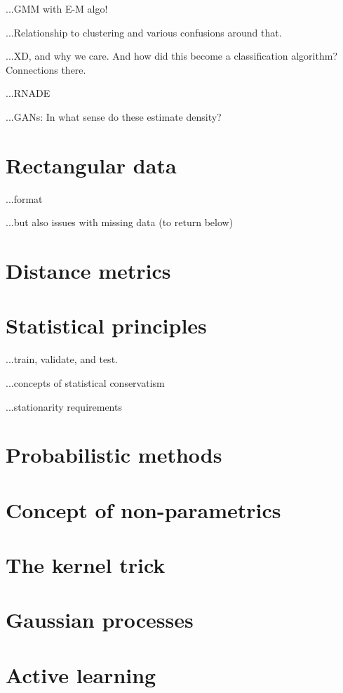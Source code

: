 \documentclass[12pt, letterpaper]{article}
\begin{document}
...GMM with E-M algo!

...Relationship to clustering and various confusions around that.

...XD, and why we care. And how did this become a classification algorithm? Connections there.

...RNADE

...GANs: In what sense do these estimate density?

\section{Rectangular data}

...format

...but also issues with missing data (to return below)

\section{Distance metrics}

\section{Statistical principles}

...train, validate, and test.

...concepts of statistical conservatism

...stationarity requirements

\section{Probabilistic methods}

\section{Concept of non-parametrics}

\section{The kernel trick}

\section{Gaussian processes}

\section{Active learning}
\end{document}
